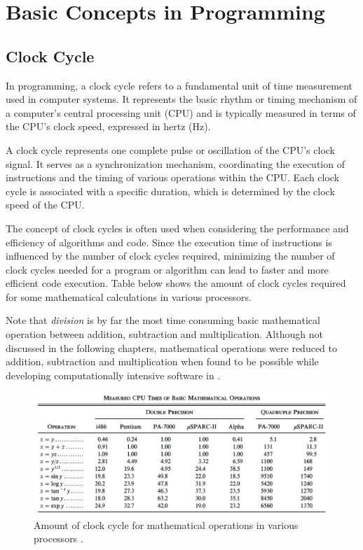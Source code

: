 \documentclass[a4paper,oneside,12pt]{report}
\numberwithin{equation}{chapter}
\begin{document}
\clearpage
\section{Basic Concepts in Programming}

\subsection{Clock Cycle}

In programming, a clock cycle refers to a fundamental unit of time measurement used in computer systems. 
It represents the basic rhythm or timing mechanism of a computer's central processing unit (CPU) and is typically measured in terms of the CPU's clock speed, expressed in hertz (Hz).

A clock cycle represents one complete pulse or oscillation of the CPU's clock signal. 
It serves as a synchronization mechanism, coordinating the execution of instructions and the timing of various operations within the CPU.
Each clock cycle is associated with a specific duration, which is determined by the clock speed of the CPU.

The concept of clock cycles is often used when considering the performance and efficiency of algorithms and code. 
Since the execution time of instructions is influenced by the number of clock cycles required, minimizing the number of clock cycles needed for a program or algorithm can lead to faster and more efficient code execution.
Table below shows the amount of clock cycles required for some mathematical calculations in various processors.

Note that \textit{division} is by far the most time consuming basic mathematical operation between addition, subtraction and multiplication.
Although not discussed in the following chapters, mathematical operations were reduced to addition, subtraction and multiplication when found to be possible while developing computationally intensive software in .

\begin{figure}[H]
    \centering
    \includegraphics[width=.95\textwidth]{./figures/cpu_instruction_speed.png}
    \vspace{20pt}
    \caption{Amount of clock cycle for mathematical operations in various processors \cite{cpu_instruction_speed}.}
\end{figure}
\end{document}
